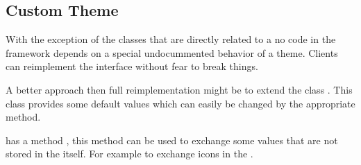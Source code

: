 \subsection{Custom Theme}
With the exception of the classes that are directly related to a  no code in the framework depends on a special undocummented behavior of a theme. Clients can reimplement the interface  without fear to break things.

A better approach then full reimplementation might be to extend the class . This class provides some default values which can easily be \linebreak changed by the appropriate  method.

 has a method , this method can be used to exchange some values that are not stored in the  itself. For example to exchange icons in the .

